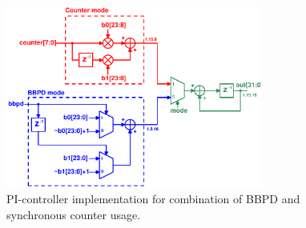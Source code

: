 			\begin{figure}[htb!]
			        \centering
			        \includegraphics[width=0.75\textwidth, angle=0]{./figs/mux_datapath}
			    \caption{PI-controller implementation for combination of BBPD and synchronous counter usage.}
			    \label{fig:pi_dig_imp}
			\end{figure}






